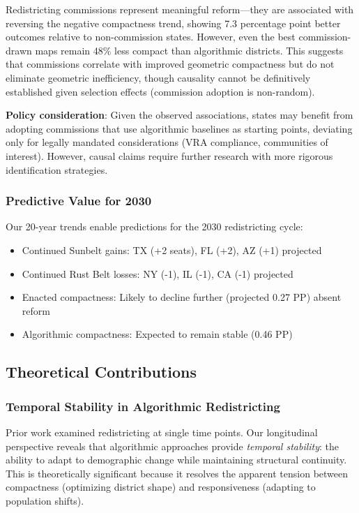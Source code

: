 Redistricting commissions represent meaningful reform—they are associated with reversing the negative compactness trend, showing 7.3 percentage point better outcomes relative to non-commission states. However, even the best commission-drawn maps remain 48\% less compact than algorithmic districts. This suggests that commissions correlate with improved geometric compactness but do not eliminate geometric inefficiency, though causality cannot be definitively established given selection effects (commission adoption is non-random).

\textbf{Policy consideration}: Given the observed associations, states may benefit from adopting commissions that use algorithmic baselines as starting points, deviating only for legally mandated considerations (VRA compliance, communities of interest). However, causal claims require further research with more rigorous identification strategies.

\subsubsection{Predictive Value for 2030}

Our 20-year trends enable predictions for the 2030 redistricting cycle:
\begin{itemize}
    \item Continued Sunbelt gains: TX (+2 seats), FL (+2), AZ (+1) projected
    \item Continued Rust Belt losses: NY (-1), IL (-1), CA (-1) projected
    \item Enacted compactness: Likely to decline further (projected 0.27 PP) absent reform
    \item Algorithmic compactness: Expected to remain stable (0.46 PP)
\end{itemize}

\subsection{Theoretical Contributions}

\subsubsection{Temporal Stability in Algorithmic Redistricting}

Prior work examined redistricting at single time points. Our longitudinal perspective reveals that algorithmic approaches provide \textit{temporal stability}: the ability to adapt to demographic change while maintaining structural continuity. This is theoretically significant because it resolves the apparent tension between compactness (optimizing district shape) and responsiveness (adapting to population shifts).

